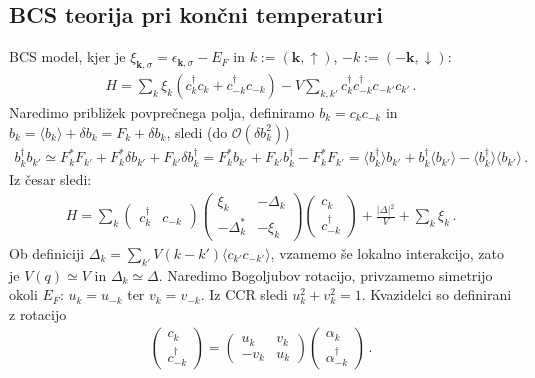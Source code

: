 \documentclass[a4paper,10pt]{article}
\renewcommand{\vec}[1]{\mathbf{#1}}
\begin{document}
\subsection{BCS teorija pri končni temperaturi}
BCS model, kjer je $\xi_{\vec{k}, \sigma} = \epsilon_{\vec{k}, \sigma} - E_F$ in $k := (\vec{k}, \uparrow)$, $-k := (\vec{-k}, \downarrow)$:
\begin{align}
  H = \sum_k \xi_k (c_k^\dagger c_k + c_{-k}^\dagger c_{-k}) - V \sum_{k,k'} c_k^\dagger c_{-k}^\dagger c_{-k'} c_{k'}\,.
\end{align}
Naredimo približek povprečnega polja, definiramo $b_k = c_{k} c_{-k}$ in $b_k = \langle b_k\rangle + \delta b_k = F_k  + \delta b_k$, sledi (do $\mathcal{O}(\delta b_k^2)$)
\begin{align}
  b_k^\dagger b_{k'} \simeq  F_k^* F_{k'} + F_k^* \delta b_{k'} + F_{k'} \delta b_k^\dagger = F_k^* b_{k'} + F_{k'} b_k^\dagger - F_k^* F_{k'} =  \langle b_k^\dagger \rangle b_{k'} + b_k^\dagger \langle b_{k'} \rangle - \langle b_k^\dagger \rangle \langle b_{k'} \rangle \,.
\end{align}
Iz česar sledi: 
\begin{align}
  H = \sum_k \begin{pmatrix} c_k^\dagger & c_{-k} \end{pmatrix} \begin{pmatrix} \xi_k & -\Delta_k \\ -\Delta_k^* & -\xi_k \end{pmatrix} \begin{pmatrix} c_k \\ c_{-k}^\dagger \end{pmatrix} + \frac{\vert{}\Delta\vert{}^2}{V} + \sum_k \xi_k \,.
\end{align}
Ob definiciji $\Delta_k = \sum_{k'} V(k-k') \langle c_{k'}c_{-k'}\rangle$, vzamemo še lokalno interakcijo, zato je $V(q)\simeq V$ in $\Delta_k \simeq \Delta$. Naredimo Bogoljubov rotacijo, privzamemo simetrijo okoli $E_F$: $u_k = u_{-k}$ ter $v_k = v_{-k}$. Iz  CCR sledi $u_k^2+v_k^2=1$. 
Kvazidelci so definirani z rotacijo 
\begin{align}
  \begin{pmatrix} c_k \\ c_{-k}^\dagger \end{pmatrix} = \begin{pmatrix} u_k & v_k \\ -v_k & u_k \end{pmatrix} \begin{pmatrix} \alpha_k \\ \alpha_{-k}^\dagger \end{pmatrix}\,.
\end{align}
\end{document}

